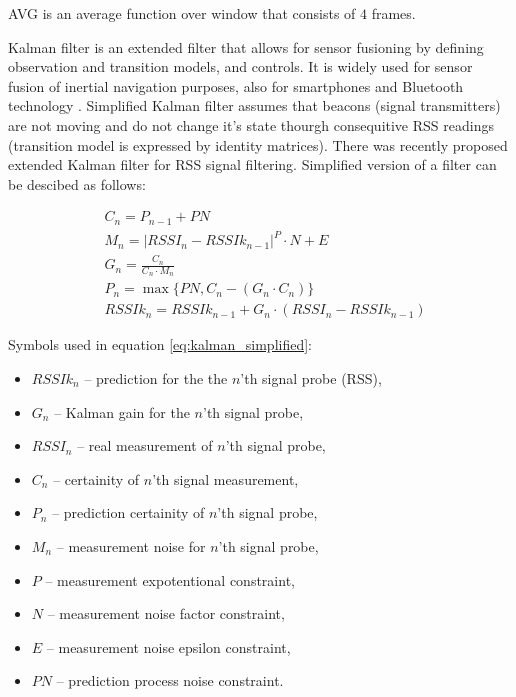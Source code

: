 \documentclass[../main.tex]{subfiles}
\begin{document}
AVG is an average function over window that consists of $4$ frames.

Kalman filter is an extended filter that allows for sensor fusioning by defining observation and transition models, and controls. It is widely used for sensor fusion of inertial navigation purposes\cite{inertial_navi_velocity_model}, also for smartphones \cite{inertial_navi_bike}\cite{indoor_navi_for_android}\cite{thesis_smartphone_inertial_plus_rfid} and Bluetooth technology \cite{beacon_rssi_analysis}\cite{discover_beacons_and_position}\cite{article_indoor_ble_rssi_filtering}\cite{article_inertial_active_beacons_calculus_kalman}. Simplified Kalman filter assumes that beacons (signal transmitters) are not moving and do not change it's state thourgh consequitive RSS readings (transition model is expressed by identity matrices). There was recently proposed extended Kalman filter for RSS signal filtering\cite{article_rss_kalman}. Simplified version of a filter can be descibed as follows:

\begin{equation}
\label{eq:kalman_simplified}
\begin{aligned}
& C_n = P_{n-1} + PN	\\
& M_n = |RSSI_n-RSSIk_{n-1}|^P \cdot N + E	\\
& G_n = \frac{C_n}{C_n \cdot M_n}	\\
& P_n = \max\{PN, C_n - (G_n \cdot C_n)\}	\\
& RSSIk_n = RSSIk_{n-1} + G_n \cdot (RSSI_n -  RSSIk_{n-1})
\end{aligned}
\end{equation}

Symbols used in equation \ref{eq:kalman_simplified}:
\begin{itemize}
	\item $RSSIk_n$ -- prediction for the the $n$'th signal probe (RSS),
	\item $G_n$ -- Kalman gain for the $n$'th signal probe,
	\item $RSSI_n$ -- real measurement of $n$'th signal probe,
	\item $C_n$ -- certainity of $n$'th signal measurement,
	\item $P_n$ -- prediction certainity of $n$'th signal probe,
	\item $M_n$ -- measurement noise for $n$'th signal probe,
	\item $P$ -- measurement expotentional constraint,
	\item $N$ -- measurement noise factor constraint,
	\item $E$ -- measurement noise epsilon constraint,
	\item $PN$ -- prediction process noise constraint.
\end{itemize}
\end{document}
